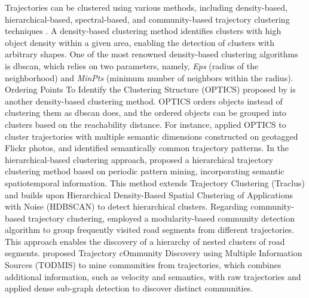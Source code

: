 \documentclass{article}
\theoremstyle{remark}
\begin{document}
Trajectories can be clustered using various methods, including density-based, hierarchical-based, spectral-based, and community-based trajectory clustering techniques \citep{liu_stccd_2020}. A density-based clustering method identifies clusters with high object density within a given area, enabling the detection of clusters with arbitrary shapes. One of the most renowned density-based clustering algorithms is \acrshort{dbscan}, which relies on two parameters, namely, \textit{Eps} (radius of the neighborhood) and \textit{MinPts} (minimum number of neighbors within the radius). Ordering Points To Identify the Clustering Structure (OPTICS) proposed by \cite{ankerst_optics_1999} is another density-based clustering method. OPTICS orders objects instead of clustering them as \acrshort{dbscan} does, and the ordered objects can be grouped into clusters based on the reachability distance. For instance, \cite{cai_mining_2018} applied OPTICS to cluster trajectories with multiple semantic dimensions constructed on geotagged Flickr photos, and identified semantically common trajectory patterns. In the hierarchical-based clustering approach, \cite{zhang_hierarchical_2018} proposed a hierarchical trajectory clustering method based on periodic pattern mining, incorporating semantic spatiotemporal information. This method extends Trajectory Clustering (Traclus) \citep{lee_trajectory_2007} and builds upon Hierarchical Density-Based Spatial Clustering of Applications with Noise (HDBSCAN) \citep{campello_density-based_2013} to detect hierarchical clusters. Regarding community-based trajectory clustering, \cite{el_mahrsi_graph-based_2013} employed a modularity-based community detection algorithm to group frequently visited road segments from different trajectories. This approach enables the discovery of a hierarchy of nested clusters of road segments. \cite{liu_todmis_2013} proposed Trajectory cOmmunity Discovery using Multiple Information Sources (TODMIS) to mine communities from trajectories, which combines additional information, such as velocity and semantics, with raw trajectories and applied dense sub-graph detection to discover distinct communities.
\end{document}
